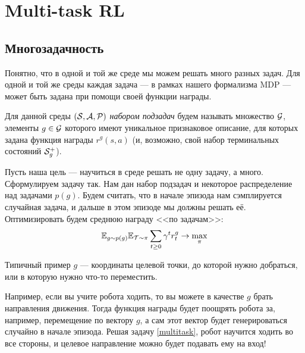 \section{Multi-task RL}\label{sec:multitask}

\subsection{Многозадачность}

Понятно, что в одной и той же среде мы можем решать много разных задач. Для одной и той же среды каждая задача --- в рамках нашего формализма MDP --- может быть задана при помощи своей функции награды.

\begin{definition}
Для данной среды $(\mathcal{S}, \mathcal{A}, \mathcal{P})$ \emph{набором подзадач} будем называть множество $\mathcal{G}$, элементы $g \in \mathcal{G}$ которого имеют уникальное признаковое описание, для которых задана функция награды $r^g(s, a)$ (и, возможно, свой набор терминальных состояний $\mathcal{S}^+_g$).
\end{definition}

Пусть наша цель --- научиться в среде решать не одну задачу, а много. Сформулируем задачу так. Нам дан набор подзадач и некоторое распределение над задачами $p(g)$. Будем считать, что в начале эпизода нам сэмплируется случайная задача, и дальше в этом эпизоде мы должны решать её. Оптимизировать будем среднюю награду <<по задачам>>:
\begin{equation}\label{multitask}
\mathbb{E}_{g \sim p(g)} \mathbb{E}_{\mathcal{T} \sim \pi} \sum_{t \ge 0}\gamma^t r^g_t \to \max_{\pi}
\end{equation}

\begin{example}
Типичный пример $g$ --- координаты целевой точки, до которой нужно добраться, или в которую нужно что-то переместить.
\end{example}

\begin{example}
Например, если вы учите робота ходить, то вы можете в качестве $g$ брать направления движения. Тогда функция награды будет поощрять робота за, например, перемещение по вектору $g$, а сам этот вектор будет генерироваться случайно в начале эпизода. Решая задачу \eqref{multitask}, робот научится ходить во все стороны, и целевое направление можно будет подавать ему на вход!
\end{example}

